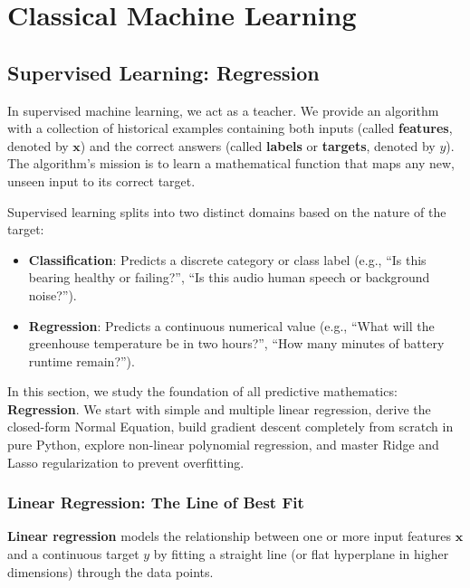 \chapter{Classical Machine Learning}\label{ch:classical_ml}
\section{Supervised Learning: Regression}\label{sec:regression}

In supervised machine learning, we act as a teacher. We provide an algorithm with a collection of historical examples containing both inputs (called \textbf{features}, denoted by $\mathbf{x}$) and the correct answers (called \textbf{labels} or \textbf{targets}, denoted by $y$). The algorithm's mission is to learn a mathematical function that maps any new, unseen input to its correct target.

Supervised learning splits into two distinct domains based on the nature of the target:
\begin{itemize}
    \item \textbf{Classification}: Predicts a discrete category or class label (e.g., ``Is this bearing healthy or failing?'', ``Is this audio human speech or background noise?'').
    \item \textbf{Regression}: Predicts a continuous numerical value (e.g., ``What will the greenhouse temperature be in two hours?'', ``How many minutes of battery runtime remain?'').
\end{itemize}

In this section, we study the foundation of all predictive mathematics: \textbf{Regression}. We start with simple and multiple linear regression, derive the closed-form Normal Equation, build gradient descent completely from scratch in pure Python, explore non-linear polynomial regression, and master Ridge and Lasso regularization to prevent overfitting.

\subsection{Linear Regression: The Line of Best Fit}

\begin{keyidea}
\textbf{Linear regression} models the relationship between one or more input features $\mathbf{x}$ and a continuous target $y$ by fitting a straight line (or flat hyperplane in higher dimensions) through the data points.
\end{keyidea}

